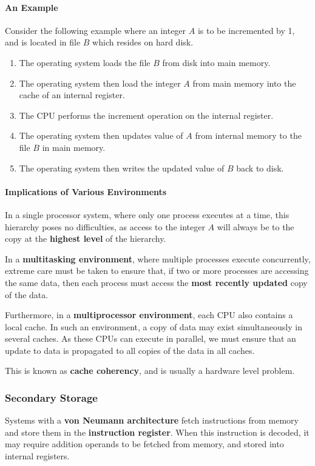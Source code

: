 \documentclass{article}
\begin{document}
\paragraph{An Example}

Consider the following example where an integer \(A\) is to be incremented by 1, and is located in file \(B\) which resides on hard disk.
\begin{enumerate}
    \item The operating system loads the file \(B\) from disk into main memory.
    \item The operating system then load the integer \(A\) from main memory into the cache of an internal register.
    \item The CPU performs the increment operation on the internal register.
    \item The operating system then updates value of \(A\) from internal memory to the file \(B\) in main memory.
    \item The operating system then writes the updated value of \(B\) back to disk.
\end{enumerate}
\paragraph{Implications of Various Environments}

In a single processor system, where only one process executes at a time,
this hierarchy poses no difficulties, as access to the integer \(A\) will
always be to the copy at the \textbf{highest level} of the hierarchy.

In a \textbf{multitasking environment}, where multiple processes execute concurrently,
extreme care must be taken to ensure that, if two or more processes are accessing the same data,
then each process must access the \textbf{most recently updated} copy of the data.

Furthermore, in a \textbf{multiprocessor environment}, each CPU also contains a local cache.
In such an environment, a copy of data may exist simultaneously
in several caches. As these CPUs can execute in parallel, we must ensure that
an update to data is propagated to all copies of the data in all caches.

This is known as \textbf{cache coherency}, and is usually a hardware level problem.
\subsubsection{Secondary Storage}
Systems with a \textbf{von Neumann architecture} fetch instructions from memory and
store them in the \textbf{instruction register}. When this instruction is decoded,
it may require addition operands to be fetched from memory, and stored into internal
registers.
\end{document}
